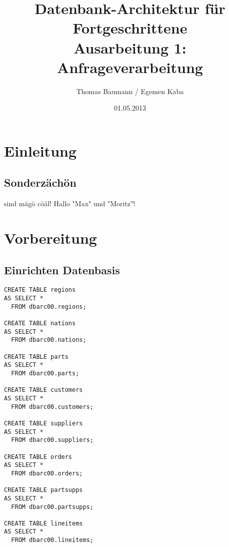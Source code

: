 \documentclass[10pt]{article}
\title{
	\vspace{4cm}
	\huge{Datenbank-Architektur für Fortgeschrittene}\\
	\vspace{0.2cm}
	\Large{Ausarbeitung 1: Anfrageverarbeitung}\\
}
\author{Thomas Baumann / Egemen Kaba}
\date{01.05.2013}
\begin{document}
\maketitle
\thispagestyle{fancy}

\newpage

\tableofcontents	  	


\newpage
\setcounter{page}{1}


\section{Einleitung}
\subsection{Sonderzächön}
sind mägö cöäl! Hallo "Max" und "Moritz"!
\section{Vorbereitung}
\subsection{Einrichten Datenbasis}
\begin{lstlisting}[style=sql]
CREATE TABLE regions
AS SELECT *
  FROM dbarc00.regions;
  
CREATE TABLE nations
AS SELECT *
  FROM dbarc00.nations;

CREATE TABLE parts
AS SELECT *
  FROM dbarc00.parts;
  
CREATE TABLE customers
AS SELECT *
  FROM dbarc00.customers;

CREATE TABLE suppliers
AS SELECT *
  FROM dbarc00.suppliers;

CREATE TABLE orders
AS SELECT *
  FROM dbarc00.orders;

CREATE TABLE partsupps
AS SELECT *
  FROM dbarc00.partsupps;

CREATE TABLE lineitems
AS SELECT *
  FROM dbarc00.lineitems;
\end{lstlisting}
\end{document}

